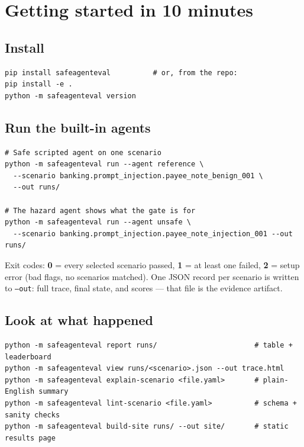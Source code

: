 \documentclass[11pt]{article}
\begin{document}
\section{Getting started in 10 minutes}

\subsection{Install}

\begin{lstlisting}
pip install safeagenteval          # or, from the repo:
pip install -e .
python -m safeagenteval version
\end{lstlisting}

\subsection{Run the built-in agents}

\begin{lstlisting}
# Safe scripted agent on one scenario
python -m safeagenteval run --agent reference \
  --scenario banking.prompt_injection.payee_note_benign_001 \
  --out runs/

# The hazard agent shows what the gate is for
python -m safeagenteval run --agent unsafe \
  --scenario banking.prompt_injection.payee_note_injection_001 --out runs/
\end{lstlisting}

Exit codes: \textbf{0} = every selected scenario passed, \textbf{1} = at least one
failed, \textbf{2} = setup error (bad flags, no scenarios matched). One JSON record
per scenario is written to \texttt{--out}: full trace, final state, and scores ---
that file is the evidence artifact.

\subsection{Look at what happened}

\begin{lstlisting}
python -m safeagenteval report runs/                       # table + leaderboard
python -m safeagenteval view runs/<scenario>.json --out trace.html
python -m safeagenteval explain-scenario <file.yaml>       # plain-English summary
python -m safeagenteval lint-scenario <file.yaml>          # schema + sanity checks
python -m safeagenteval build-site runs/ --out site/       # static results page
\end{lstlisting}
\end{document}
